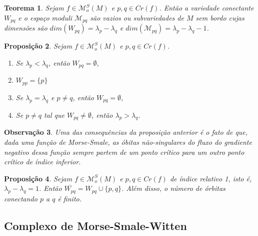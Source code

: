 \documentclass[12pt]{book}
\newtheorem{teorema}{Teorema}[section]
\newtheorem{observacao}[teorema]{Observação}
\newtheorem{proposicao}[teorema]{Proposição}
\newcommand{\espacomoduli}[2]{\mathcal{M}_{#1#2}}
\newcommand{\funcoesmorsesmale}[1]{\mathcal{M}^{S}_{o}(#1)}
\newcommand{\pontoscriticos}[1]{\textit{Cr}(#1)}
\newcommand{\variedadeconectantepontos}[2]{W_{#1#2}}
\begin{document}
	 \begin{teorema}
	 	Sejam $f\in \funcoesmorsesmale{M}$ e $p,q \in \pontoscriticos{f}$. Então a variedade conectante $\variedadeconectantepontos{p}{q}$ e o espaço moduli $\espacomoduli{p}{q}$ são vazios ou subvariedades de $M$ sem bordo cujas dimensões são $dim(\variedadeconectantepontos{p}{q}) = \lambda_{p} -\lambda_{q}$ e $dim(\espacomoduli{p}{q}) = \lambda_{p} -\lambda_{q}-1$. 
	 \end{teorema}
	 
	 \begin{proposicao}
	 	Sejam $f \in \funcoesmorsesmale{M}$ e $p,q \in \pontoscriticos{f}$.
	 	\begin{enumerate}
	 		\item Se $\lambda_{p}<\lambda_{q}$, então $\variedadeconectantepontos{p}{q} = \emptyset$,
	 		
	 		\item $\variedadeconectantepontos{p}{p} = \{p\}$
	 		
	 		\item Se $\lambda_{p} = \lambda_{q}$ e $p\neq q$, então $\variedadeconectantepontos{p}{q} = \emptyset$,
	 		
	 		\item Se $p \neq q$ tal que $\variedadeconectantepontos{p}{q} \neq \emptyset$, então $\lambda_{p}>\lambda_{q}$.
	 	\end{enumerate}
	 \end{proposicao}

	\begin{observacao}
		Uma das consequências da proposição anterior é o fato de que, dada uma função de Morse-Smale, as óbitas não-singulares do fluxo do gradiente negativo dessa função sempre partem de um ponto crítico para um outro ponto crítico de índice inferior.
	\end{observacao}
	
	\begin{proposicao}
		Sejam $f \in \funcoesmorsesmale{M}$ e $p,q \in \pontoscriticos{f}$ de índice relativo 1, isto é, $\lambda_{p} - \lambda_{q} = 1$. Então $\overline{\variedadeconectantepontos{p}{q}} = \variedadeconectantepontos{p}{q} \cup \{p,q\}$. Além disso, o número de órbitas conectando $p$ a $q$ é finito.
	\end{proposicao}

	\subsection{Complexo de Morse-Smale-Witten}
	
\end{document}

